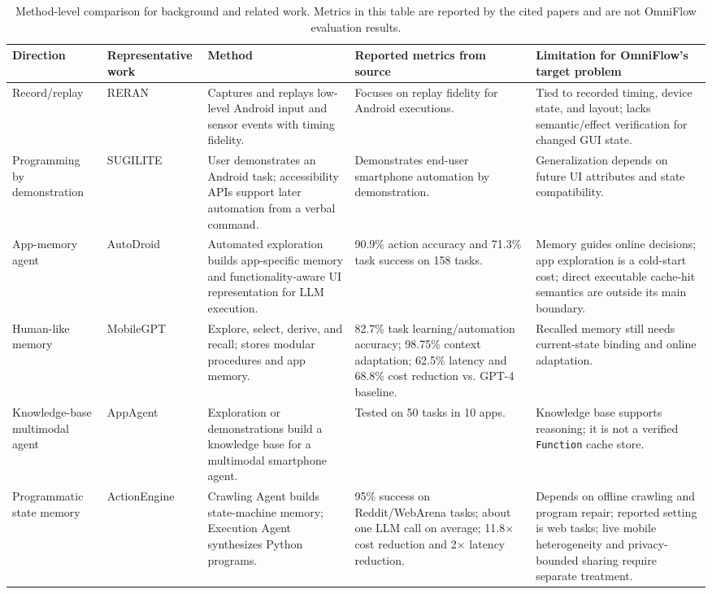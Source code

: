 \documentclass[sigplan,10pt]{acmart}
\newcommand{\sysname}{OmniFlow\xspace}
\begin{document}
\begin{table}[t]
\centering
\small
\caption{Method-level comparison for background and related work. Metrics in
this table are reported by the cited papers and are not \sysname evaluation
results.}
\label{tab:expanded-related-summary}
\begin{tabularx}{\textwidth}{@{}p{}p{}X X X@{}}
\toprule
\textbf{Direction} & \textbf{Representative work} & \textbf{Method} & \textbf{Reported metrics from source} & \textbf{Limitation for \sysname's target problem} \\
\midrule
Record/replay & RERAN~\cite{gomez2013reran} & Captures and replays low-level Android input and sensor events with timing fidelity. & Focuses on replay fidelity for Android executions. & Tied to recorded timing, device state, and layout; lacks semantic/effect verification for changed GUI state. \\
\addlinespace
Programming by demonstration & SUGILITE~\cite{li2017sugilite} & User demonstrates an Android task; accessibility APIs support later automation from a verbal command. & Demonstrates end-user smartphone automation by demonstration. & Generalization depends on future UI attributes and state compatibility. \\
\addlinespace
App-memory agent & AutoDroid~\cite{wen2024autodroid} & Automated exploration builds app-specific memory and functionality-aware UI representation for LLM execution. & 90.9\% action accuracy and 71.3\% task success on 158 tasks. & Memory guides online decisions; app exploration is a cold-start cost; direct executable cache-hit semantics are outside its main boundary. \\
\addlinespace
Human-like memory & MobileGPT~\cite{lee2024mobilegpt} & Explore, select, derive, and recall; stores modular procedures and app memory. & 82.7\% task learning/automation accuracy; 98.75\% context adaptation; 62.5\% latency and 68.8\% cost reduction vs. GPT-4 baseline. & Recalled memory still needs current-state binding and online adaptation. \\
\addlinespace
Knowledge-base multimodal agent & AppAgent~\cite{zhang2025appagent} & Exploration or demonstrations build a knowledge base for a multimodal smartphone agent. & Tested on 50 tasks in 10 apps. & Knowledge base supports reasoning; it is not a verified \texttt{Function} cache store. \\
\addlinespace
Programmatic state memory & ActionEngine~\cite{zhong2026actionengine} & Crawling Agent builds state-machine memory; Execution Agent synthesizes Python programs. & 95\% success on Reddit/WebArena tasks; about one LLM call on average; 11.8$\times$ cost reduction and 2$\times$ latency reduction. & Depends on offline crawling and program repair; reported setting is web tasks; live mobile heterogeneity and privacy-bounded sharing require separate treatment. \\

\end{tabularx}
\end{table}
\end{document}
